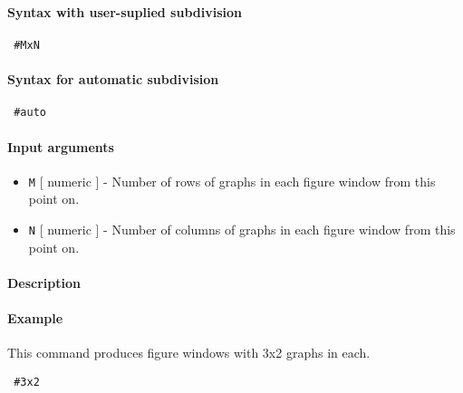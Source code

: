 


	\paragraph{Syntax with user-suplied subdivision}
 
 \begin{verbatim}
 #MxN
 \end{verbatim}
 
 \paragraph{Syntax for automatic subdivision}
 
 \begin{verbatim}
 #auto
 \end{verbatim}
 
 \paragraph{Input arguments}
 
 \begin{itemize}
 \item
   \texttt{M} {[} numeric {]} - Number of rows of graphs in each figure
   window from this point on.
 \item
   \texttt{N} {[} numeric {]} - Number of columns of graphs in each
   figure window from this point on.
 \end{itemize}
 
 \paragraph{Description}
 
 \paragraph{Example}
 
 This command produces figure windows with 3x2 graphs in each.
 
 \begin{verbatim}
 #3x2
 \end{verbatim}


